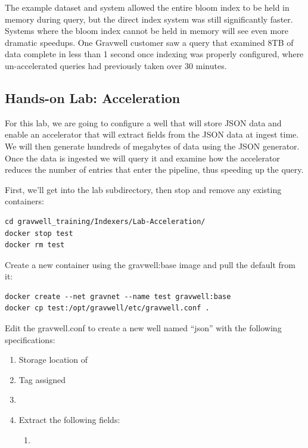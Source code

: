 {The example dataset and system allowed the entire bloom index to be
held in memory during query, but the direct index system was still
significantly faster. Systems where the bloom index cannot be held in
memory will see even more dramatic speedups. One Gravwell customer saw
a query that examined 8TB of data complete in
less than 1 second once indexing was properly configured, where un-accelerated queries
had previously taken over 30 minutes.

\subsection{Hands-on Lab: Acceleration}

For this lab, we are going to configure a well that will store JSON
data and enable an accelerator that will extract fields from the JSON
data at ingest time. We will then generate hundreds of megabytes of data
using the JSON generator. Once the data is ingested we will query
it and examine how the accelerator reduces the number of entries that
enter the pipeline, thus speeding up the query.

First, we'll get into the lab subdirectory, then stop and remove any existing containers:

\begin{Verbatim}[breaklines=true]
cd gravwell_training/Indexers/Lab-Acceleration/
docker stop test
docker rm test
\end{Verbatim}

Create a new container using the gravwell:base image and pull the
default  from it:

\begin{Verbatim}[breaklines=true]
docker create --net gravnet --name test gravwell:base
docker cp test:/opt/gravwell/etc/gravwell.conf .
\end{Verbatim}

Edit the gravwell.conf to create a new well named ``json'' with the
following specifications:

\begin{enumerate}
	\item Storage location of 
	\item Tag  assigned
	\item {}
	\item Extract the following fields:
	\begin{enumerate}
		\item {}
	\end{enumerate}
\end{enumerate}

}
